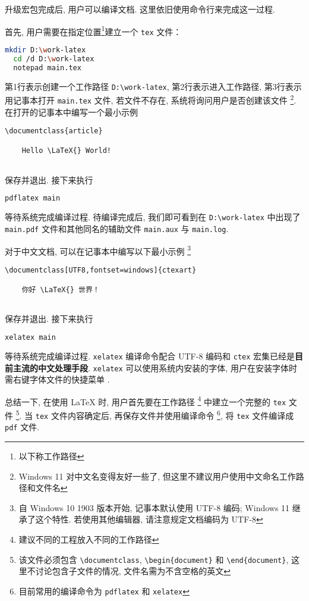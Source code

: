 升级宏包完成后, 用户可以编译文档. 
这里依旧使用命令行来完成这一过程. 

首先, 用户需要在指定位置\footnote{以下称工作路径}建立一个 \texttt{tex} 文件：
\begin{lstlisting}[language = bash]
  mkdir D:\work-latex
  cd /d D:\work-latex
  notepad main.tex
\end{lstlisting}
第1行表示创建一个工作路径 \texttt{D:\textbackslash work-latex},
第2行表示进入工作路径, 第3行表示用记事本打开 \texttt{main.tex} 文件,
若文件不存在, 系统将询问用户是否创建该文件%
\footnote{Windows 11 对中文名变得友好一些了,
但这里不建议用户使用中文命名工作路径和文件名}.
在打开的记事本中编写一个最小示例
\begin{lstlisting}[language={[LaTeX]TeX}]
  \documentclass{article}
  
    Hello \LaTeX{} World!
  
\end{lstlisting}
保存并退出. 
接下来执行
\begin{lstlisting}[language=bash]
  pdflatex main
\end{lstlisting}
等待系统完成编译过程. 
待编译完成后, 我们即可看到在 \texttt{D:\textbackslash work-latex}
中出现了 \texttt{main.pdf} 文件和其他同名的辅助文件
\texttt{main.aux} 与 \texttt{main.log}. 

对于中文文档, 可以在记事本中编写以下最小示例%
\footnote{自 Windows 10 1903 版本开始, 记事本默认使用 UTF-8 编码;
Windows 11 继承了这个特性.
若使用其他编辑器,
请注意规定文档编码为 UTF-8}%
\begin{lstlisting}[language={[LaTeX]TeX}]
  \documentclass[UTF8,fontset=windows]{ctexart}
  
    你好 \LaTeX{} 世界！
  
\end{lstlisting}
保存并退出.
接下来执行
\begin{lstlisting}[language=bash]
  xelatex main
\end{lstlisting}
等待系统完成编译过程.
\texttt{xelatex} 编译命令配合 UTF-8 编码和 \texttt{ctex}
宏集已经是\textbf{目前主流的中文处理手段}.
\texttt{xelatex} 可以使用系统内安装的字体,
用户在安装字体时需右键字体文件的快捷菜单 .

总结一下, 在使用 \LaTeX{} 时, 用户首先要在工作路径%
\footnote{建议不同的工程放入不同的工作路径}%
中建立一个完整的 \texttt{tex} 文件%
\footnote{该文件必须包含 \texttt{\textbackslash documentclass},
\texttt{\textbackslash begin\{document\}} 和
\texttt{\textbackslash end\{document\}},
这里不讨论包含子文件的情况,
文件名需为不含空格的英文}.
当 \texttt{tex} 文件内容确定后, 再保存文件并使用编译命令%
\footnote{目前常用的编译命令为 \texttt{pdflatex} 和 \texttt{xelatex}},
将 \texttt{tex} 文件编译成 \texttt{pdf} 文件. 

